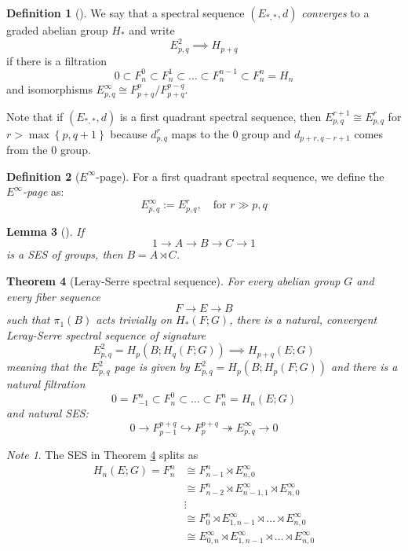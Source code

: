 \documentclass[reqno]{amsart}
\newtheorem{theorem}{Theorem}[section]
\newtheorem{lemma}[theorem]{Lemma}
\theoremstyle{definition}
\newtheorem{definition}[theorem]{Definition}
\theoremstyle{remark}
\newtheorem*{note}{Note}
\begin{document}
\begin{definition}[]
    We say that a spectral sequence
    $\left( E_{*,*},d \right) $ \textit{converges} to
    a graded abelian group
    $H_*$ and write
    \[
    E_{p,q}^2 \implies H_{p+q}
    \] 
    if there is a filtration
    \[
    0 \subset F_n^{0} \subset F_n^{1} \subset \ldots
    \subset F_{n}^{n-1} \subset F_{n}^{n} = H_n
    \] 
    and isomorphisms $E_{p,q}^{\infty} \cong
    F_{p+q}^{p} / F_{p+q}^{p-q}$.
\end{definition}

Note that if
$\left( E_{*,*},d \right) $ is a first quadrant
spectral sequence, then
$E_{p,q}^{r+1} \cong
E_{p,q}^{r}$ for
$r > \max \left\{ p,q+1 \right\} $ because
$d_{p,q}^{r}$ maps to the $0$ group
and $d_{p+r,q-r+1}$ comes from the $0$ group.

\begin{definition}[$E^{\infty}$-page]
    For a first quadrant spectral sequence, we
    define the \textit{$E^{\infty}$-page} as:
    \[
    E_{p,q}^{\infty} :=
    E_{p,q}^{r}, \quad \text{for } r \gg p,q
    \] 
\end{definition}

\begin{lemma}[]
    If
    \[
    1 \to A \to B \to C \to 1
    \] 
    is a SES of groups, then $B = A \rtimes C$.
\end{lemma}

\begin{theorem}[Leray-Serre spectral sequence]\label{LSSS}
    For every abelian group $G$ and every
    fiber sequence
    \[
    F \to E \to B
    \] 
    such that $\pi_1 (B)$ acts trivially on
    $H_* (F;G)$, there is a natural, convergent
    \textit{Leray-Serre spectral sequence}
    of signature
    \[
    E_{p,q}^2 = H_p \left( B; H_q(F;G) \right) \implies
    H_{p+q}(E;G)
    \] 
    meaning that the $E_{p,q}^2$ page is given
    by $E_{p,q}^2 = H_p \left( B; H_p (F;G) \right) $ and
    there is a natural filtration
    \[
    0 = F_{-1}^{n} \subset F_n^{0} \subset 
    \ldots \subset F_{n}^{n} = H_n(E;G)
    \] 
    and natural SES:
    \[
    0 \to F_{p-1}^{p+q} \hookrightarrow 
    F_{p}^{p+q} \twoheadrightarrow E_{p,q}^{\infty} \to 0
    \] 
\end{theorem}

\begin{note}
    The SES in Theorem \ref{LSSS} splits as
    \begin{align*}
    H_n(E;G) = F_{n}^{n} 
    &\cong F_{n-1}^{n} \rtimes E_{n,0}^{\infty}\\
    &\cong F_{n-2}^{n} \rtimes E_{n-1,1}^{\infty} \rtimes
    E_{n,0}^{\infty}\\
    &\vdots \\
    &\cong F_0^{n} \rtimes E_{1,n-1}^{\infty} \rtimes \ldots
    \rtimes E_{n,0}^{\infty}\\
    &\cong E_{0,n}^{\infty} \rtimes E_{1,n-1}^{\infty} \rtimes \ldots
    \rtimes E_{n,0}^{\infty}
    \end{align*}

\end{note}
\end{document}
